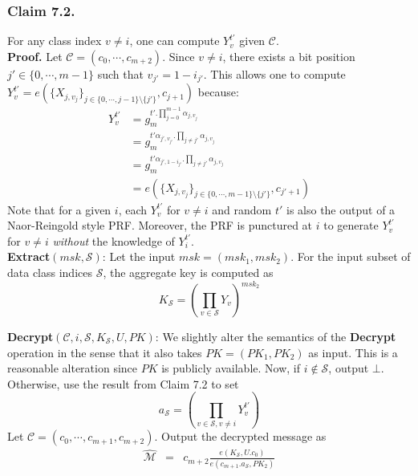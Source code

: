 \subsubsection{Claim 7.2.} For any class index $v\neq i$, one can compute $Y^{t'}_v$ given $\mathcal{C}$.\\

\noindent \textbf{Proof.} Let $\mathcal{C}=(c_0,\cdots,c_{m+2})$. Since $v\neq i$, there exists a bit position $j'\in\{0,\cdots,m-1\}$ such that $v_{j'}=1- i_{j'}$. This allows one to compute $Y^{t'}_v=e(\{X_{j,v_j}\}_{j\in\{0,\cdots,j-1\}\setminus\{j'\}},c_{j+1})$ because:
\begin{equation}
\begin{split}
 Y^{t'}_v &= g^{t'.\prod_{j=0}^{m-1}\alpha_{j,v_{j}}}_m\\
 &=g^{t'\alpha_{j',v_{j'}}.\prod_{j\neq j'}\alpha_{j,v_{j}}}_m\\
 &=g^{t'\alpha_{j',1-i_{j'}}.\prod_{j\neq j'}\alpha_{j,v_{j}}}_m\\
 &=e(\{X_{j,v_j}\}_{j\in\{0,\cdots,m-1\}\setminus\{j'\}},c_{j'+1})\nonumber
\end{split}
\end{equation}
\noindent Note that for a given $i$, each $Y^{t'}_v$ for $v\neq i$ and random $t'$ is also the output of a Naor-Reingold style PRF. Moreover, the PRF is punctured at $i$ to generate $Y^{t'}_v$ for $v\neq i$ \emph{without} the knowledge of $Y^{t'}_i$.\\  
 
\noindent \textbf{Extract}$(msk,\mathcal{S})$: Let the input $msk=(msk_1,msk_2)$. For the input subset of data class indices $\mathcal{S}$, the aggregate key is computed as 
\begin{equation}
 K_{\mathcal{S}} = \left(\prod_{v\in\mathcal{S}}{Y_{v}}\right)^{msk_2}\nonumber
\end{equation} 

\noindent \textbf{Decrypt}$(\mathcal{C},i,\mathcal{S},K_{\mathcal{S}},U,PK)$: We slightly alter the semantics of the \textbf{Decrypt} operation in the sense that it also takes $PK=(PK_1,PK_2)$ as input. This is a reasonable alteration since $PK$ is publicly available. Now, if $i\notin\mathcal{S}$, output $\bot$. Otherwise, use the result from Claim 7.2 to set
\begin{equation}
a_{\mathcal{S}}=\left(\prod_{v\in\mathcal{S},v\neq i}Y^{t'}_{v}\right)\nonumber
\end{equation}
Let $\mathcal{C}=(c_0,\cdots,c_{m+1},c_{m+2})$. Output the decrypted message as  
\begin{eqnarray} 
\hat{\mathcal{M}}&=&c_{m+2}\frac{{e}(K_{\mathcal{S}},U.c_0)}{{e}(c_{m+1}.a_{\mathcal{S}},PK_2)}\nonumber
\end{eqnarray}

